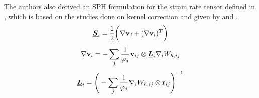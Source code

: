 The authors also derived an SPH formulation for the strain rate tensor defined in , which is based on the studies done on kernel correction \parencite{bonet1999variational, khayyer2008corrected} and given by  and . 
\begin{equation}
    \underline{\bm{S}}_i = \frac{1}{2} \bigg( \nabla \mathbf{v}_i + (\nabla \mathbf{v}_i)^T \bigg)
    \label{eq:Wang2020-strain-rate-tensor}
\end{equation}
\begin{equation}
    \nabla \mathbf{v}_i = - \sum_j \frac{1}{\varphi_j} \mathbf{v}_{ij} \otimes \underline{\bm{L}}_i \nabla_{i} W_{h, ij}
    \label{eq:Wang2020-vel-grad-term}
\end{equation}
\begin{equation}
    \underline{\bm{L}}_i = \Bigg(- \sum_j \frac{1}{\varphi_j} \nabla_{i} W_{h, ij} \otimes \mathbf{r}_{ij} \Bigg)^{-1}
    \label{eq:Wang2020-corrective-matrix}
\end{equation}

